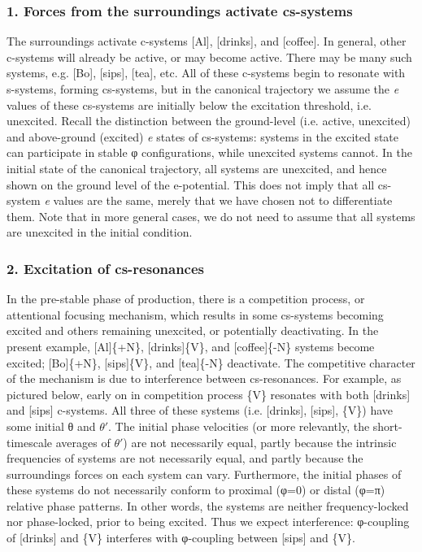 \subsubsection{{1. Forces from the surroundings activate cs-systems}} 

The surroundings activate c-systems [Al], [drinks], and [coffee]. In general, other c-systems will already be active, or may become active. There may be many such systems, e.g. [Bo], [sips], [tea], etc. All of these c-systems begin to resonate with s-systems, forming cs-systems, but in the canonical trajectory we assume the \textit{e} values of these cs-systems are initially below the excitation threshold, i.e. unexcited. Recall the distinction between the ground-level (i.e. active, unexcited) and above-ground (excited) \textit{e} states of cs-systems: systems in the excited state can participate in stable φ configurations, while unexcited systems cannot. In the initial state of the canonical trajectory, all systems are unexcited, and hence shown on the ground level of the e-potential. This does not imply that all cs-system \textit{e} values are the same, merely that we have chosen not to differentiate them. Note that in more general cases, we do not need to assume that all systems are unexcited in the initial condition.

\subsubsection{2. Excitation of cs-resonances}

In the pre-stable phase of production, there is a competition process, or attentional focusing mechanism, which results in some cs-systems becoming excited and others remaining unexcited, or potentially deactivating. In the present example, [Al]\{+N\}, [drinks]\{V\}, and [coffee]\{-N\} systems become excited; [Bo]\{+N\}, [sips]\{V\}, and [tea]\{-N\} deactivate. The competitive character of the mechanism is due to interference between cs-resonances. For example, as pictured below, early on in competition process \{V\} resonates with both [drinks] and [sips] c-systems. All three of these systems (i.e. [drinks], [sips], \{V\}) have some initial θ and $\theta ′$. The initial phase velocities (or more relevantly, the short-timescale averages of $\theta ′$) are not necessarily equal, partly because the intrinsic frequencies of systems are not necessarily equal, and partly because the surroundings forces on each system can vary. Furthermore, the initial phases of these systems do not necessarily conform to proximal (φ=0) or distal (φ=π) relative phase patterns. In other words, the systems are neither frequency-locked nor phase-locked, prior to being excited. Thus we expect interference: φ{}-coupling of [drinks] and \{V\} interferes with φ{}-coupling between [sips] and \{V\}.

